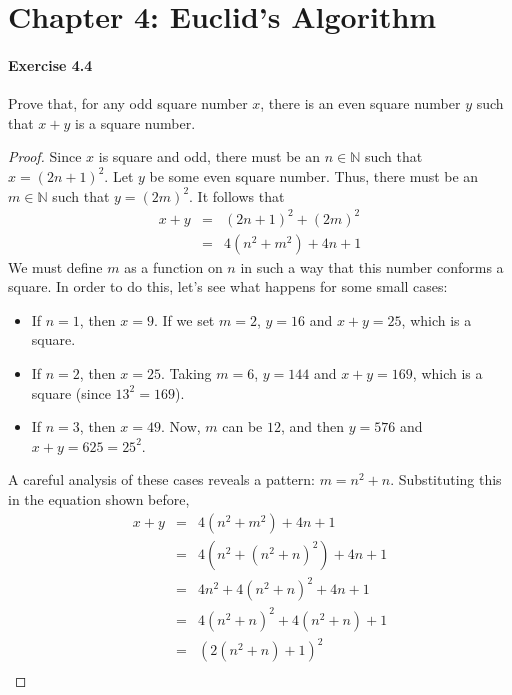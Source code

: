 \documentclass[a4paper,10pt]{article}
\newcommand{\Nat}{\ensuremath{\mathbb{N}}}
\begin{document}
\pagestyle{fancyplain}
\cfoot{- \thepage/\pageref{LastPage} -}
\lhead{}
\chead{}
\rhead{}
\renewcommand{\headrulewidth}{0pt}

\section*{Chapter 4: Euclid's Algorithm}

\paragraph{Exercise 4.4}
Prove that, for any odd square number $x$, there is an even square number $y$
such that $x+y$ is a square number.\\

\begin{proof}
Since $x$ is square and odd, there must be an $n \in \Nat$ such that
$x = (2n+1)^2$. Let $y$ be some even square number. Thus, there must be an
$m \in \Nat$ such that $y = (2m)^2$. It follows that
\begin{eqnarray*}
x+y &=& (2n+1)^2 + (2m)^2 \\
    &=& 4(n^2 + m^2) + 4n + 1 
\end{eqnarray*}
We must define $m$ as a function on $n$ in such a way that this number conforms
a square. In order to do this, let's see what happens for some small cases:
\begin{itemize}
    \item If $n = 1$, then $x = 9$. If we set $m = 2$, $y = 16$ and $x+y = 25$,
    which is a square.
    \item If $n = 2$, then $x = 25$. Taking $m = 6$, $y = 144$ and $x+y = 169$,
    which is a square (since $13^2 = 169$).
    \item If $n = 3$, then $x = 49$. Now, $m$ can be $12$, and then $y = 576$
    and $x+y = 625 = 25^2$.
\end{itemize}
A careful analysis of these cases reveals a pattern: $m = n^2 + n$. Substituting
this in the equation shown before,
\begin{eqnarray*}
x+y &=& 4(n^2 + m^2) + 4n + 1  \\
    &=& 4(n^2 + (n^2 + n)^2) + 4n + 1 \\
    &=& 4n^2 + 4(n^2 + n)^2 + 4n + 1 \\
    &=& 4(n^2 + n)^2 + 4(n^2 + n) + 1 \\
    &=& (2(n^2 + n) + 1)^2 \\
\end{eqnarray*}
\end{proof}
\end{document}
